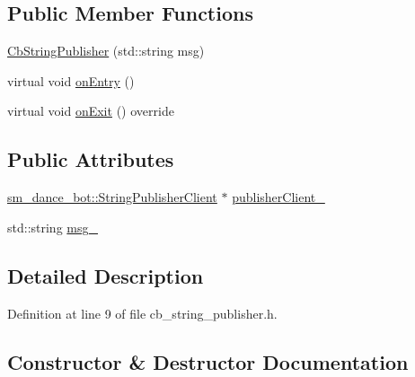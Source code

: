\subsection*{Public Member Functions}
\begin{DoxyCompactItemize}
\item 
\hyperlink{classsm__dance__bot_1_1CbStringPublisher_ac08fd30f96c32387d6c0ad6130b1ea4d}{Cb\+String\+Publisher} (std\+::string msg)
\item 
virtual void \hyperlink{classsm__dance__bot_1_1CbStringPublisher_af1f114aba3bb34d40f4e3b3fb00809e9}{on\+Entry} ()
\item 
virtual void \hyperlink{classsm__dance__bot_1_1CbStringPublisher_a487d8302e60f01401a7d189382ba5f73}{on\+Exit} () override
\end{DoxyCompactItemize}
\subsection*{Public Attributes}
\begin{DoxyCompactItemize}
\item 
\hyperlink{classsm__dance__bot_1_1StringPublisherClient}{sm\+\_\+dance\+\_\+bot\+::\+String\+Publisher\+Client} $\ast$ \hyperlink{classsm__dance__bot_1_1CbStringPublisher_a18e8333d818203fbbb6e53b0c3fb5035}{publisher\+Client\+\_\+}
\item 
std\+::string \hyperlink{classsm__dance__bot_1_1CbStringPublisher_a57ebf1bedad677d9a4b40b8df271a904}{msg\+\_\+}
\end{DoxyCompactItemize}


\subsection{Detailed Description}


Definition at line 9 of file cb\+\_\+string\+\_\+publisher.\+h.



\subsection{Constructor \& Destructor Documentation}
